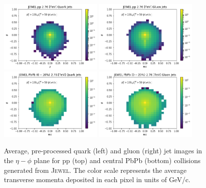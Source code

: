 \documentclass[notoc]{JHEP3}
\begin{document}
\begin{figure}[t]
\centering
\includegraphics[width=0.45\textwidth]{plots/jewel_pp_avgQuarkJet}
\includegraphics[width=0.45\textwidth]{plots/jewel_pp_avgGluonJet}
\includegraphics[width=0.45\textwidth]{plots/jewel_pbpb020_avgQuarkJet}
\includegraphics[width=0.45\textwidth]{plots/jewel_pbpb020_avgGluonJet}
\caption{Average, pre-processed quark (left) and gluon (right) jet images in the $\eta-\phi$ plane for pp (top) and central PbPb (bottom) collisions generated from \textsc{Jewel}. The color scale represents the average transverse momenta deposited in each pixel in units of GeV/c. }
\label{fig:qgjetimages}
\end{figure}
\end{document}

